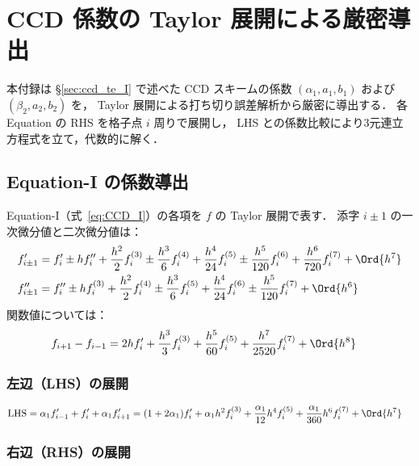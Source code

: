 \section{CCD 係数の Taylor 展開による厳密導出}
\label{app:ccd_coef_derivation}

本付録は §\ref{sec:ccd_te_I} で述べた CCD スキームの係数
$(\alpha_1, a_1, b_1)$ および $(\beta_2, a_2, b_2)$ を，
Taylor 展開による打ち切り誤差解析から厳密に導出する．
各 Equation の RHS を格子点 $i$ 周りで展開し，
LHS との係数比較により3元連立方程式を立て，代数的に解く．

\subsection{Equation-I の係数導出}
\label{app:ccd_coef_derivation_I}

Equation-I（式~\eqref{eq:CCD_I}）の各項を $f$ の Taylor 展開で表す．
添字 $i\pm1$ の一次微分値と二次微分値は：
\begin{align}
  f'_{i\pm1} &= f'_i \pm hf''_i + \frac{h^2}{2}f^{(3)}_i \pm \frac{h^3}{6}f^{(4)}_i
               + \frac{h^4}{24}f^{(5)}_i \pm \frac{h^5}{120}f^{(6)}_i
               + \frac{h^6}{720}f^{(7)}_i + \Ord{h^7} \\
  f''_{i\pm1} &= f''_i \pm hf^{(3)}_i + \frac{h^2}{2}f^{(4)}_i \pm \frac{h^3}{6}f^{(5)}_i
                + \frac{h^4}{24}f^{(6)}_i \pm \frac{h^5}{120}f^{(7)}_i + \Ord{h^6}
\end{align}
関数値については：
\begin{align}
  f_{i+1} - f_{i-1} &= 2hf'_i + \frac{h^3}{3}f^{(3)}_i + \frac{h^5}{60}f^{(5)}_i
                       + \frac{h^7}{2520}f^{(7)}_i + \Ord{h^8}
\end{align}

\subsubsection*{左辺（LHS）の展開}

\begin{align}
  \text{LHS} &= \alpha_1 f'_{i-1} + f'_i + \alpha_1 f'_{i+1}
  = (1 + 2\alpha_1)f'_i + \alpha_1 h^2 f^{(3)}_i
    + \frac{\alpha_1}{12}h^4 f^{(5)}_i + \frac{\alpha_1}{360}h^6 f^{(7)}_i + \Ord{h^7}
\end{align}

\subsubsection*{右辺（RHS）の展開}

